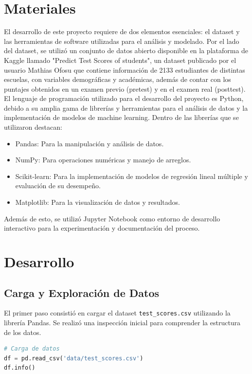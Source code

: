 \documentclass[12pt,letterpaper]{article}
\begin{document}
\section{Materiales}
El desarrollo de este proyecto requiere de dos elementos esenciales: el dataset y las herramientas de software utilizadas para el análisis y modelado.
Por el lado del dataset, se utilizó un conjunto de datos abierto disponible en la plataforma de Kaggle llamado "Predict Test Scores of students", un dataset publicado por el usuario Mathias Ofosu que contiene información de 2133 estudiantes de distintas escuelas, con variables demográficas y académicas, además de contar con los puntajes obtenidos en un examen previo (pretest) y en el examen real (posttest).
El lenguaje de programación utilizado para el desarrollo del proyecto es Python, debido a su amplia gama de librerías y herramientas para el análisis de datos y la implementación de modelos de machine learning. Dentro de las librerías que se utilizaron destacan:
\begin{itemize}
    \item Pandas: Para la manipulación y análisis de datos.
    \item NumPy: Para operaciones numéricas y manejo de arreglos.
    \item Scikit-learn: Para la implementación de modelos de regresión lineal múltiple y evaluación de su desempeño.
    \item Matplotlib: Para la visualización de datos y resultados.
\end{itemize}
Además de esto, se utilizó Jupyter Notebook como entorno de desarrollo interactivo para la experimentación y documentación del proceso.

\section{Desarrollo}

\subsection{Carga y Exploración de Datos}
El primer paso consistió en cargar el dataset \texttt{test\_scores.csv} utilizando la librería Pandas. Se realizó una inspección inicial para comprender la estructura de los datos.

\begin{lstlisting}[language=Python]
# Carga de datos
df = pd.read_csv('data/test_scores.csv')
df.info()
\end{lstlisting}
\end{document}
